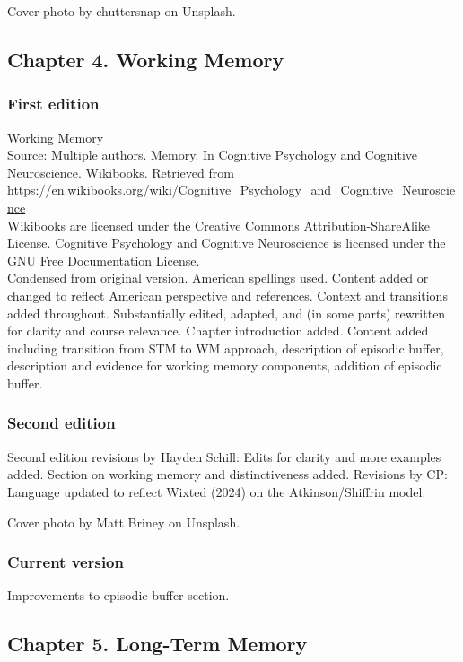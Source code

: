 \documentclass[
]{krantz}
\begin{document}
Cover photo by chuttersnap on Unsplash.

\subsection*{Chapter 4. Working Memory}\label{chapter-4.-working-memory}


\subsubsection*{First edition}\label{first-edition-4}


Working Memory\\
Source: Multiple authors. Memory. In Cognitive Psychology and Cognitive Neuroscience. Wikibooks. Retrieved from \url{https://en.wikibooks.org/wiki/Cognitive_Psychology_and_Cognitive_Neuroscience}\\
Wikibooks are licensed under the Creative Commons Attribution-ShareAlike License.
Cognitive Psychology and Cognitive Neuroscience is licensed under the GNU Free Documentation License.\\
Condensed from original version. American spellings used. Content added or changed to reflect American perspective and references. Context and transitions added throughout. Substantially edited, adapted, and (in some parts) rewritten for clarity and course relevance. Chapter introduction added. Content added including transition from STM to WM approach, description of episodic buffer, description and evidence for working memory components, addition of episodic buffer.

\subsubsection*{Second edition}\label{second-edition-4}


Second edition revisions by Hayden Schill: Edits for clarity and more examples added. Section on working memory and distinctiveness added. Revisions by CP: Language updated to reflect Wixted (2024) on the Atkinson/Shiffrin model.

Cover photo by Matt Briney on Unsplash.

\subsubsection*{Current version}\label{current-version-2}


Improvements to episodic buffer section.

\subsection*{Chapter 5. Long-Term Memory}\label{chapter-5.-long-term-memory}
\end{document}
